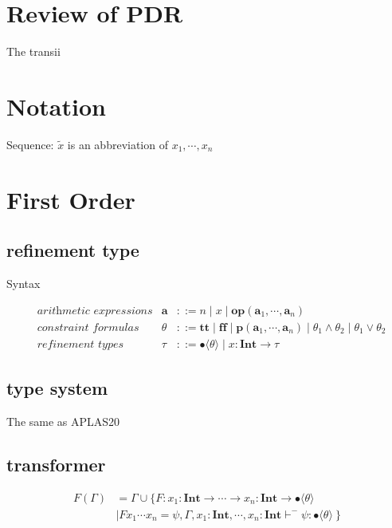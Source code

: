 \documentclass[runningheads]{llncs}
\newcommand \true {\textbf{tt}}
\newcommand \false {\textbf{ff}}
\newcommand \predicate {\textbf{p}}
\newcommand \arith {\textbf{a}}
\newcommand \operator {\mathbin{\textbf{op}}}
\newcommand \stypeint {\textbf{Int}}
\newcommand \stypebool {\bullet}
\newcommand \constraint {\theta}
\newcommand \refty {\tau}
\newcommand \typeint[1]{{#1} : \stypeint}
\newcommand \typebool[1]{\stypebool \langle #1 \rangle}
\begin{document}
\section{Review of PDR}

The transii

\section{Notation}

Sequence: \(\tilde{x}\) is an abbreviation of \(x_1, \cdots, x_n\)

\section{First Order}

\subsection{refinement type}

Syntax

\begin{align*}
  &\textit{arithmetic expressions} &
  \arith &::=
  n
  \mid
  x
  \mid
  \operator(\arith_1, \cdots, \arith_n)
  \\
  &\textit{constraint formulas}&
  \constraint &::=
  \true
  \mid \false
  \mid \predicate(\arith_1, \cdots, \arith_n)
  \mid \constraint_1 \land \constraint_2
  \mid \constraint_1 \lor \constraint_2
  \\
  &\textit{refinement types}&
  \refty &::=
  \typebool{\theta}
  \mid \typeint{x} \rightarrow \refty
\end{align*}



\subsection{type system}

The same as APLAS20

\subsection{transformer}

\begin{align*}
    F(\Gamma)
    &= \Gamma \cup \{ F: \typeint{x_1} \rightarrow \cdots
    \rightarrow \typeint{x_n} \rightarrow \typebool{\theta} \\
    &\mid
    F x_1 \cdots x_n = \psi, \Gamma, x_1: \stypeint, \cdots, x_n: \stypeint
    \vdash^{-} \psi: \typebool{\theta}\ \}
\end{align*}
\end{document}
